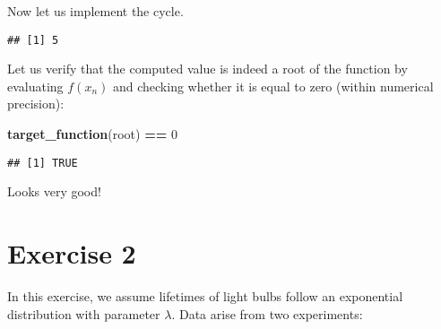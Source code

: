 \documentclass[
]{article}
\newenvironment{Shaded}{\begin{snugshade}}{\end{snugshade}}
\newcommand{\CommentTok}[1]{\textcolor[rgb]{0.56,0.35,0.01}{\textit{#1}}}
\newcommand{\ControlFlowTok}[1]{\textcolor[rgb]{0.13,0.29,0.53}{\textbf{#1}}}
\newcommand{\DecValTok}[1]{\textcolor[rgb]{0.00,0.00,0.81}{#1}}
\newcommand{\FunctionTok}[1]{\textcolor[rgb]{0.13,0.29,0.53}{\textbf{#1}}}
\newcommand{\NormalTok}[1]{#1}
\newcommand{\OtherTok}[1]{\textcolor[rgb]{0.56,0.35,0.01}{#1}}
\newcommand{\SpecialCharTok}[1]{\textcolor[rgb]{0.81,0.36,0.00}{\textbf{#1}}}
\begin{document}
Now let us implement the cycle.

\begin{Shaded}
\end{Shaded}

\begin{verbatim}
## [1] 5
\end{verbatim}

Let us verify that the computed value is indeed a root of the function
by evaluating \(f(x_n)\) and checking whether it is equal to zero
(within numerical precision):

\begin{Shaded}
\begin{Highlighting}[]
\FunctionTok{target\_function}\NormalTok{(root) }\SpecialCharTok{==} \DecValTok{0}
\end{Highlighting}
\end{Shaded}

\begin{verbatim}
## [1] TRUE
\end{verbatim}

Looks very good!

\section{Exercise 2}\label{exercise-2}

In this exercise, we assume lifetimes of light bulbs follow an
exponential distribution with parameter \(\lambda\). Data arise from two
experiments:
\end{document}
